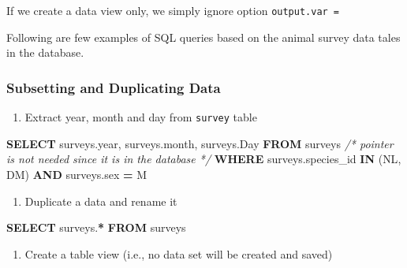 \documentclass[
]{book}
\newenvironment{Shaded}{\begin{snugshade}}{\end{snugshade}}
\newcommand{\CommentTok}[1]{\textcolor[rgb]{0.56,0.35,0.01}{\textit{#1}}}
\newcommand{\DataTypeTok}[1]{\textcolor[rgb]{0.13,0.29,0.53}{#1}}
\newcommand{\KeywordTok}[1]{\textcolor[rgb]{0.13,0.29,0.53}{\textbf{#1}}}
\newcommand{\NormalTok}[1]{#1}
\newcommand{\OperatorTok}[1]{\textcolor[rgb]{0.81,0.36,0.00}{\textbf{#1}}}
\newcommand{\StringTok}[1]{\textcolor[rgb]{0.31,0.60,0.02}{#1}}
\providecommand{\tightlist}{%
  \setlength{\itemsep}{0pt}\setlength{\parskip}{0pt}}
\begin{document}
If we create a data view only, we simply ignore option \texttt{output.var\ =}

Following are few examples of SQL queries based on the animal survey data tales in the database.

\hypertarget{subsetting-and-duplicating-data}{%
\subsubsection{Subsetting and Duplicating Data}\label{subsetting-and-duplicating-data}}

\begin{enumerate}
\def\labelenumi{\arabic{enumi}.}
\tightlist
\item
  Extract year, month and day from \texttt{survey} table
\end{enumerate}

\begin{Shaded}
\begin{Highlighting}[]
\KeywordTok{SELECT} 
\NormalTok{  surveys.}\DataTypeTok{year}\NormalTok{, surveys.}\DataTypeTok{month}\NormalTok{, surveys.}\DataTypeTok{Day}
\KeywordTok{FROM} 
\NormalTok{ surveys }\CommentTok{/* pointer is not needed since it is in the database */}
\KeywordTok{WHERE}
\NormalTok{  surveys.species\_id }\KeywordTok{IN}\NormalTok{ (}\StringTok{\textquotesingle{}NL\textquotesingle{}}\NormalTok{, }\StringTok{\textquotesingle{}DM\textquotesingle{}}\NormalTok{) }\KeywordTok{AND}
\NormalTok{  surveys.sex }\OperatorTok{=} \StringTok{\textquotesingle{}M\textquotesingle{}}
\end{Highlighting}
\end{Shaded}

\begin{enumerate}
\def\labelenumi{\arabic{enumi}.}
\setcounter{enumi}{1}
\tightlist
\item
  Duplicate a data and rename it
\end{enumerate}

\begin{Shaded}
\begin{Highlighting}[]
\KeywordTok{SELECT} 
\NormalTok{  surveys.}\OperatorTok{*}
\KeywordTok{FROM} 
\NormalTok{ surveys}
\end{Highlighting}
\end{Shaded}

\begin{enumerate}
\def\labelenumi{\arabic{enumi}.}
\setcounter{enumi}{2}
\tightlist
\item
  Create a table view (i.e., no data set will be created and saved)
\end{enumerate}
\end{document}
